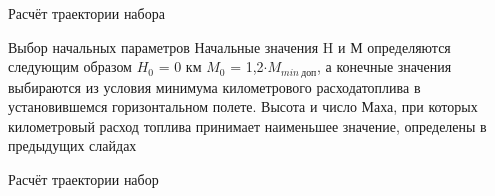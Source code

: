 \begin{frame}{Расчёт траектории набора}
    \begin{block}{Выбор начальных параметров}
        Начальные значения H и М определяются следующим образом $H_0$ = 0 км $M_0$ = 1,2$\cdot M_{min \ \text{доп}}$, а конечные значения выбираются из
        условия минимума километрового расходатоплива в установившемся горизонтальном полете. Высота и число Маха, при которых километровый расход 
        топлива принимает наименьшее значение, определены в предыдущих слайдах 
    \end{block}
\end{frame}

\begin{frame}{Расчёт траектории набор}
    \begin{minipage}[c]{0.45\textwidth}
    \end{minipage}
    \begin{minipage}[c]{0.45\textwidth}
    \end{minipage}
\end{frame}
 
